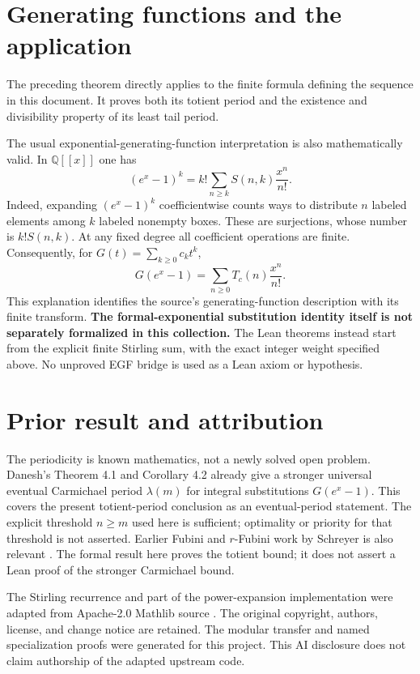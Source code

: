 \documentclass[11pt,a4paper]{article}
\theoremstyle{remark}
\newcommand{\Q}{\mathbb Q}
\begin{document}
\section{Generating functions and the application}
The preceding theorem directly applies to the finite formula defining
the sequence in this document. It proves both its totient period and
the existence and divisibility property of its least tail period.

The usual exponential-generating-function interpretation is also
mathematically valid. In $\Q[[x]]$ one has
\[
(e^x-1)^k=k!\sum_{n\ge k}S(n,k)\frac{x^n}{n!}.
\]
Indeed, expanding $(e^x-1)^k$ coefficientwise counts ways to distribute
$n$ labeled elements among $k$ labeled nonempty boxes. These are
surjections, whose number is $k!S(n,k)$. At any fixed degree all
coefficient operations are finite. Consequently, for
$G(t)=\sum_{k\ge0}c_kt^k$,
\[
G(e^x-1)=\sum_{n\ge0}T_c(n)\frac{x^n}{n!}.
\]
This explanation identifies the source's generating-function description
with its finite transform. \textbf{The formal-exponential substitution
identity itself is not separately formalized in this collection.}
The Lean theorems instead start from the explicit finite Stirling sum,
with the exact integer weight specified above. No unproved EGF bridge is
used as a Lean axiom or hypothesis.

\section{Prior result and attribution}
The periodicity is known mathematics, not a newly solved open problem.
Danesh's Theorem 4.1 and Corollary 4.2 \cite{danesh} already give a
stronger universal eventual Carmichael period $\lambda(m)$ for integral
substitutions $G(e^x-1)$. This covers the present totient-period
conclusion as an eventual-period statement. The explicit threshold
$n\ge m$ used here is sufficient; optimality or priority for that
threshold is not asserted. Earlier Fubini and $r$-Fubini work by
Schreyer is also relevant \cite{schreyer}. The formal result here
proves the totient bound; it does not assert a Lean proof of the
stronger Carmichael bound.

The Stirling recurrence and part of the power-expansion implementation
were adapted from Apache-2.0 Mathlib source \cite{mathlib}.
The original copyright, authors, license, and change notice are retained.
The modular transfer and named specialization proofs were generated
for this project. This AI disclosure does not claim authorship of
the adapted upstream code.
\end{document}
